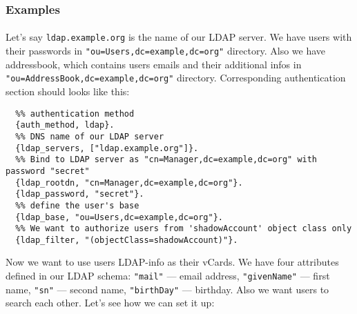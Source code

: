 \documentclass[a4paper,10pt]{article}
\newcommand{\term}[1]{\texttt{#1}}
\begin{document}
\subsubsection{Examples}
\label{ldapexamples}

\paragraph{}

Let's say \term{ldap.example.org} is the name of our LDAP server. We have
users with their passwords in \term{"ou=Users,dc=example,dc=org"} directory.
Also we have addressbook, which contains users emails and their additional
infos in \term{"ou=AddressBook,dc=example,dc=org"} directory.  Corresponding
authentication section should looks like this:

\begin{verbatim}
  %% authentication method
  {auth_method, ldap}.
  %% DNS name of our LDAP server
  {ldap_servers, ["ldap.example.org"]}.
  %% Bind to LDAP server as "cn=Manager,dc=example,dc=org" with password "secret"
  {ldap_rootdn, "cn=Manager,dc=example,dc=org"}.
  {ldap_password, "secret"}.
  %% define the user's base
  {ldap_base, "ou=Users,dc=example,dc=org"}.
  %% We want to authorize users from 'shadowAccount' object class only
  {ldap_filter, "(objectClass=shadowAccount)"}.
\end{verbatim}

Now we want to use users LDAP-info as their vCards.  We have four attributes
defined in our LDAP schema: \term{"mail"} --- email address, \term{"givenName"}
--- first name, \term{"sn"} --- second name, \term{"birthDay"} --- birthday.
Also we want users to search each other.  Let's see how we can set it up:
\end{document}
